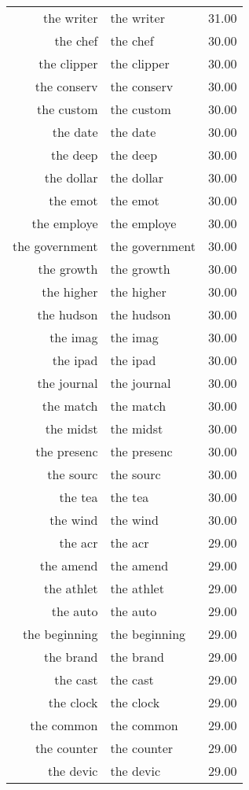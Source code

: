 \begin{table}[ht]
\begin{tabular}{rlr}
  the writer & the writer & 31.00 \\ 
  the chef & the chef & 30.00 \\ 
  the clipper & the clipper & 30.00 \\ 
  the conserv & the conserv & 30.00 \\ 
  the custom & the custom & 30.00 \\ 
  the date & the date & 30.00 \\ 
  the deep & the deep & 30.00 \\ 
  the dollar & the dollar & 30.00 \\ 
  the emot & the emot & 30.00 \\ 
  the employe & the employe & 30.00 \\ 
  the government & the government & 30.00 \\ 
  the growth & the growth & 30.00 \\ 
  the higher & the higher & 30.00 \\ 
  the hudson & the hudson & 30.00 \\ 
  the imag & the imag & 30.00 \\ 
  the ipad & the ipad & 30.00 \\ 
  the journal & the journal & 30.00 \\ 
  the match & the match & 30.00 \\ 
  the midst & the midst & 30.00 \\ 
  the presenc & the presenc & 30.00 \\ 
  the sourc & the sourc & 30.00 \\ 
  the tea & the tea & 30.00 \\ 
  the wind & the wind & 30.00 \\ 
  the acr & the acr & 29.00 \\ 
  the amend & the amend & 29.00 \\ 
  the athlet & the athlet & 29.00 \\ 
  the auto & the auto & 29.00 \\ 
  the beginning & the beginning & 29.00 \\ 
  the brand & the brand & 29.00 \\ 
  the cast & the cast & 29.00 \\ 
  the clock & the clock & 29.00 \\ 
  the common & the common & 29.00 \\ 
  the counter & the counter & 29.00 \\ 
  the devic & the devic & 29.00 \\ 

\end{tabular}
\end{table}
